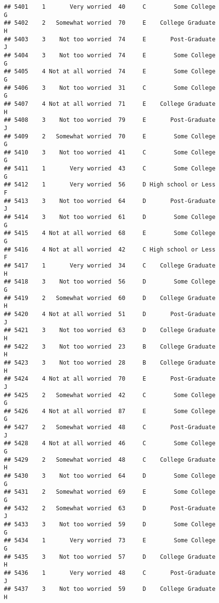 \documentclass[
]{article}
\begin{document}
\begin{verbatim}
## 5401    1       Very worried  40     C        Some College         G
## 5402    2   Somewhat worried  70     E    College Graduate         H
## 5403    3    Not too worried  74     E       Post-Graduate         J
## 5404    3    Not too worried  74     E        Some College         G
## 5405    4 Not at all worried  74     E        Some College         G
## 5406    3    Not too worried  31     C        Some College         G
## 5407    4 Not at all worried  71     E    College Graduate         H
## 5408    3    Not too worried  79     E       Post-Graduate         J
## 5409    2   Somewhat worried  70     E        Some College         G
## 5410    3    Not too worried  41     C        Some College         G
## 5411    1       Very worried  43     C        Some College         G
## 5412    1       Very worried  56     D High school or Less         F
## 5413    3    Not too worried  64     D       Post-Graduate         J
## 5414    3    Not too worried  61     D        Some College         G
## 5415    4 Not at all worried  68     E        Some College         G
## 5416    4 Not at all worried  42     C High school or Less         F
## 5417    1       Very worried  34     C    College Graduate         H
## 5418    3    Not too worried  56     D        Some College         G
## 5419    2   Somewhat worried  60     D    College Graduate         H
## 5420    4 Not at all worried  51     D       Post-Graduate         J
## 5421    3    Not too worried  63     D    College Graduate         H
## 5422    3    Not too worried  23     B    College Graduate         H
## 5423    3    Not too worried  28     B    College Graduate         H
## 5424    4 Not at all worried  70     E       Post-Graduate         J
## 5425    2   Somewhat worried  42     C        Some College         G
## 5426    4 Not at all worried  87     E        Some College         G
## 5427    2   Somewhat worried  48     C       Post-Graduate         J
## 5428    4 Not at all worried  46     C        Some College         G
## 5429    2   Somewhat worried  48     C    College Graduate         H
## 5430    3    Not too worried  64     D        Some College         G
## 5431    2   Somewhat worried  69     E        Some College         G
## 5432    2   Somewhat worried  63     D       Post-Graduate         J
## 5433    3    Not too worried  59     D        Some College         G
## 5434    1       Very worried  73     E        Some College         G
## 5435    3    Not too worried  57     D    College Graduate         H
## 5436    1       Very worried  48     C       Post-Graduate         J
## 5437    3    Not too worried  59     D    College Graduate         H

\end{verbatim}
\end{document}
